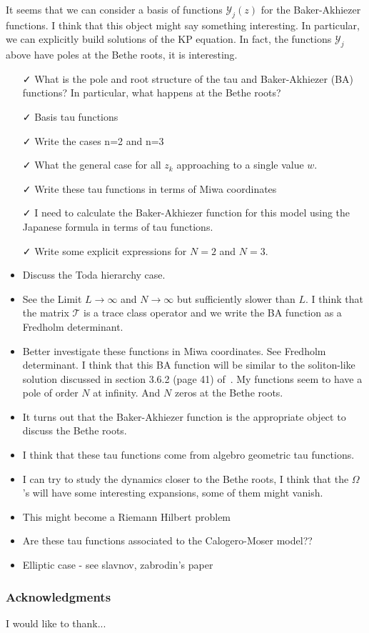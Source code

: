 \documentclass[a4paper,12pt]{amsart}
\begin{document}
It seems that we can consider a basis of functions \(\mathcal{Y}_j(z)\) for the Baker-Akhiezer
functions. I think that this object might say something interesting. In particular, we can
explicitly build solutions of the KP equation. In fact, the functions \(\mathcal{Y}_j\)
above have poles at the Bethe roots, it is interesting. 
\begin{itemize}
\item[\faCheck] What is the pole and root structure of the tau and Baker-Akhiezer (BA) functions?
  In particular, what happens at the Bethe roots?
\item[\faCheck] Basis tau functions
\item[\faCheck] Write the cases n=2 and n=3
\item[\faCheck] What the general case for all \(z_k\) approaching to a single
  value \(w\). 
\item[\faCheck] Write these tau functions in terms of Miwa coordinates
\item[\faCheck] I need to calculate the Baker-Akhiezer function for this model using the Japanese formula
  in terms of tau functions.
\item[\faCheck]  Write some explicit expressions for \(N=2\) and \(N=3\). 
\item Discuss the Toda hierarchy case. 
\item See the Limit \(L \to \infty\) and \(N \to \infty\) but sufficiently slower than \(L\). 
  I think that the matrix \(\mathcal{T}\) is a trace class operator and we write the BA function
  as a Fredholm determinant. 
\item Better investigate these functions in Miwa coordinates. See Fredholm determinant. 
  I think that this BA function will be similar to the soliton-like solution discussed in section 3.6.2 (page 41) of~\cite{Zabrodin2018}. 
  My functions seem to have a pole of order \(N\) at infinity. And \(N\) zeros at the Bethe roots. 
\item It turns out that the Baker-Akhiezer function is the appropriate object to discuss
  the Bethe roots. 
  \item I think that these tau functions come from algebro geometric tau functions. 
  \item I can try to study the dynamics closer to the Bethe roots, I think that the
    \(\Omega\)'s will have some interesting expansions, some of them might vanish. 
  \item This might become a Riemann Hilbert problem
  \item Are these tau functions associated to the Calogero-Moser model??
  \item Elliptic case - see slavnov, zabrodin's paper
\end{itemize}





\subsubsection*{Acknowledgments}
I would like to thank...

\printbibliography
\end{document}

